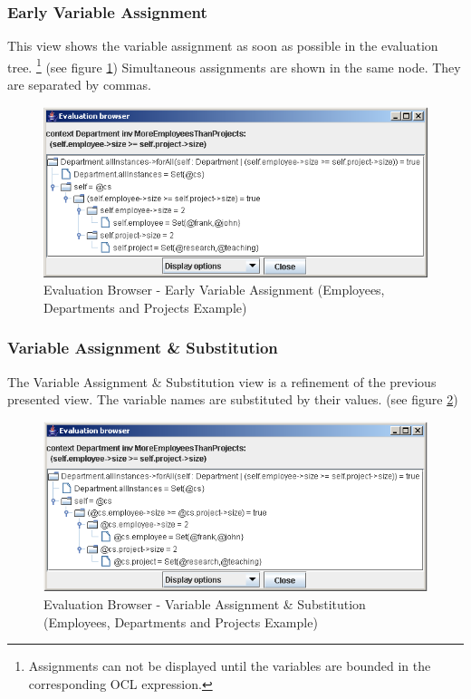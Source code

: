 \documentclass[a4paper,titlepage,oneside,final]{scrreprt} %
\begin{document}
\subsubsection{Early Variable Assignment}
This view shows the variable assignment as soon as possible
in the evaluation tree. \footnote{Assignments can not be displayed until
the variables are bounded in the corresponding
OCL expression.} (see figure \ref{fig:EvaluationBrowserEarlyAssignment})
Simultaneous assignments are shown in the same node. They are separated by commas.
\begin{figure}[ht]
\centering
\includegraphics[scale=0.7]{Screenshots/GUI/EvaluationBrowserEarlyAssignment.png}
\caption{Evaluation Browser - Early Variable Assignment (Employees, Departments and Projects Example)}
\label{fig:EvaluationBrowserEarlyAssignment}
\end{figure}
\subsubsection{Variable Assignment \& Substitution}
The Variable Assignment \& Substitution view is a refinement of the previous
presented view. The variable names are substituted by their values.
(see figure \ref{fig:EvaluationBrowserAssignmentSubstitution})
\begin{figure}[ht]
\centering
\includegraphics[scale=0.7]{Screenshots/GUI/EvaluationBrowserAssignmentSubstitution.png}
\caption{Evaluation Browser - Variable Assignment \& Substitution (Employees, Departments and Projects Example)}
\label{fig:EvaluationBrowserAssignmentSubstitution}
\end{figure}
\end{document}
